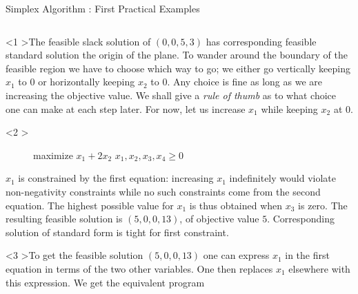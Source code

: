 \documentclass[32pt, aspectratio = 169]{beamer}
\begin{document}
\begin{frame}{Simplex Algorithm : First Practical Examples}
    \begin{columns}
        \begin{column}{.5\textwidth}
            \begin{onlyenv}<1
              >The feasible slack solution of $(0, 0, 5, 3)$ has
              corresponding feasible standard solution the origin of
              the plane. To wander around the boundary of the feasible
              region we have to choose which way to go; we either go
              vertically keeping $x_1$ to $0$ or horizontally keeping
              $x_2$ to $0$. Any choice is fine as long as we are
              increasing the objective value. We shall give a
              \textit{rule of thumb} as to what choice one can make at
              each step later. For now, let us increase $x_1$ while
              keeping $x_2$ at $0$.
            \end{onlyenv}
            \begin{onlyenv}<2
              >
              \begin{figure}
                \begin{linearProg}{
                    maximize
                  }{
                    $x_1 + 2x_2$
                  }{
                  }{
                    $x_1, x_2, x_3, x_4 \geq 0$  %
                  }
                \end{linearProg}
              \end{figure}
              $x_1$ is constrained by the first equation: increasing
              $x_1$ indefinitely would violate non-negativity
              constraints while no such constraints come from the
              second equation. The highest possible value for $x_1$ is
              thus obtained when $x_3$ is zero. The resulting feasible
              solution is $(5, 0, 0, 13)$, of objective value
              $5$. Corresponding solution of standard form is tight
              for first constraint.
            \end{onlyenv}
            \begin{onlyenv}<3
              >To get the feasible solution $(5, 0, 0, 13)$ one can
              express $x_1$ in the first equation in terms of the two
              other variables. One then replaces $x_1$ elsewhere with
              this expression. We get the equivalent program
                \begin{figure}

\end{figure}
\end{onlyenv}
\end{column}
\end{columns}
\end{frame}
\end{document}
